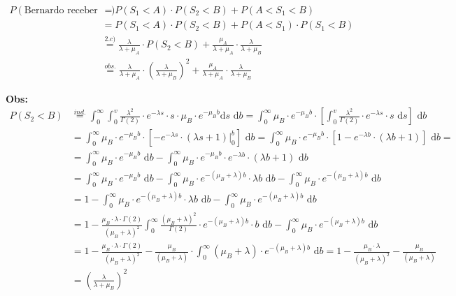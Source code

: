 \documentclass[12pt]{article}
\begin{document}
	 \begin{equation*}
		 \begin{split}
			 P(\text{Bernardo receber um rim}) & = P(S_1 < A) \cdot P(S_2 < B) + P(A < S_1 < B) \\
			 & = P(S_1 < A) \cdot P(S_2 < B) + P(A < S_1) \cdot P(S_1 < B) \\
			 & \stackrel{2.c)}{=} \frac{\lambda}{\lambda + \mu_A} \cdot P(S_2 < B) + \frac{\mu_A}{\lambda + \mu_A} \cdot \frac{\lambda}{\lambda + \mu_B} \\
			 & \stackrel{obs.}{=} \frac{\lambda}{\lambda + \mu_A} \cdot \left(\frac{\lambda}{\lambda + \mu_B} \right)^2 + \frac{\mu_A}{\lambda + \mu_A} \cdot \frac{\lambda}{\lambda + \mu_B}
		 \end{split}
	 \end{equation*}
	 
	 \textbf{Obs:} 
	  \begin{equation*}
		  \begin{split}
			 P(S_2 < B) & \stackrel{ind.}{=} \int_{0}^{\infty} \int_{0}^{v} \frac{\lambda^2}{\Gamma(2)} \cdot e^{-\lambda s} \cdot s \cdot \mu_B\cdot e^{-\mu_Bb} \text{d}s \text{ d}b = \int_{0}^{\infty} \mu_B\cdot e^{-\mu_Bb} \cdot \left[\int_{0}^{v} \frac{\lambda^2}{\Gamma(2)} \cdot  e^{-\lambda s} \cdot s \text{ d}s \right]\text{ d}b \\
			 & = \int_{0}^{\infty} \mu_B\cdot e^{-\mu_Bb} \cdot \left[ -e^{-\lambda s} \cdot (\lambda s + 1) \rvert_{0}^{b} \right]\text{ d}b =  \int_{0}^{\infty} \mu_B\cdot e^{-\mu_Bb} \cdot \left[ 1 - e^{-\lambda b} \cdot (\lambda b + 1) \right]\text{ d}b = \\
			 & = \int_{0}^{\infty} \mu_B\cdot e^{-\mu_Bb} \text{ d}b - \int_{0}^{\infty} \mu_B\cdot e^{-\mu_Bb} \cdot  e^{-\lambda b} \cdot (\lambda b + 1)\text{ d}b \\
			 & = \int_{0}^{\infty} \mu_B\cdot e^{-\mu_Bb} \text{ d}b - \int_{0}^{\infty} \mu_B\cdot e^{-(\mu_B + \lambda)b} \cdot \lambda b \text{ d}b - \int_{0}^{\infty} \mu_B\cdot e^{-(\mu_B + \lambda)b} \text{ d}b \\
			 & = 1 - \int_{0}^{\infty} \mu_B\cdot e^{-(\mu_B + \lambda)b} \cdot \lambda b \text{ d}b - \int_{0}^{\infty} \mu_B\cdot e^{-(\mu_B + \lambda)b} \text{ d}b \\
			 & = 1 - \frac{\mu_B \cdot \lambda \cdot \Gamma(2)}{(\mu_B + \lambda)^2}\int_{0}^{\infty} \frac{(\mu_B + \lambda)^2}{\Gamma(2)} \cdot e^{-(\mu_B + \lambda)b} \cdot b \text{ d}b - \int_{0}^{\infty} \mu_B\cdot e^{-(\mu_B + \lambda)b} \text{ d}b \\
			 & = 1 - \frac{\mu_B \cdot \lambda \cdot \Gamma(2)}{(\mu_B + \lambda)^2}- \frac{\mu_B}{(\mu_B + \lambda)} \cdot \int_{0}^{\infty} (\mu_B + \lambda) \cdot e^{-(\mu_B + \lambda)b} \text{ d}b =  1 - \frac{\mu_B \cdot \lambda}{(\mu_B + \lambda)^2}- \frac{\mu_B}{(\mu_B + \lambda)} \\
			 & = \left(\frac{\lambda}{\lambda + \mu_B} \right)^2
		  \end{split}
	  \end{equation*}
	 
\end{document}
